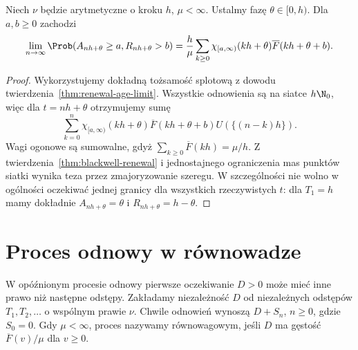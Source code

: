 \begin{stwierdzenie}
Niech $\nu$ będzie arytmetyczne o kroku $h$,
$\mu<\infty$. Ustalmy fazę $\theta\in[0,h)$.
Dla $a,b\ge0$ zachodzi
\[
\lim_{n\to\infty}\Prob(A_{nh+\theta}\ge a,R_{nh+\theta}>b)
=\frac h\mu\sum_{k\ge0}
\chi_{[a,\infty)}(kh+\theta)\overline F(kh+\theta+b).
\]
\end{stwierdzenie}
\begin{proof}
Wykorzystujemy dokładną tożsamość splotową
z dowodu twierdzenia~\ref{thm:renewal-age-limit}.
Wszystkie odnowienia są na siatce $h\N_0$,
więc dla $t=nh+\theta$ otrzymujemy sumę
\[
\sum_{k=0}^n
\chi_{[a,\infty)}(kh+\theta)\overline F(kh+\theta+b)
U(\{(n-k)h\}).
\]
Wagi ogonowe są sumowalne, gdyż
$\sum_{k\ge0}\overline F(kh)=\mu/h$.
Z twierdzenia~\ref{thm:blackwell-renewal}
i jednostajnego ograniczenia mas punktów siatki
wynika teza przez zmajoryzowanie szeregu.
W szczególności nie wolno w ogólności oczekiwać
jednej granicy dla wszystkich rzeczywistych $t$:
dla $T_1=h$ mamy dokładnie $A_{nh+\theta}=\theta$
i $R_{nh+\theta}=h-\theta$.
\end{proof}

\section{Proces odnowy w równowadze}

\begin{definicja}
W opóźnionym procesie odnowy pierwsze oczekiwanie
$D>0$ może mieć inne prawo niż następne odstępy.
Zakładamy niezależność $D$ od niezależnych odstępów
$T_1,T_2,\ldots$ o wspólnym prawie $\nu$.
Chwile odnowień wynoszą
$D+S_n$, $n\ge0$, gdzie $S_0=0$.
Gdy $\mu<\infty$, proces nazywamy równowagowym,
jeśli $D$ ma gęstość
$\overline F(v)/\mu$ dla $v\ge0$.
\end{definicja}

